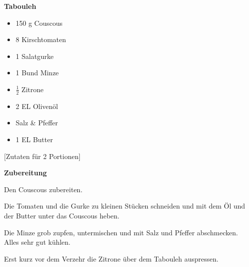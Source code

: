 

\parindent0pt	

\pagestyle{empty}


\textbf{{\LARGE Tabouleh}}%

\hrulefill
\vspace*{\fill}
\begin{multicols}{2}	


\begin{itemize}
\item 150 g Couscous
\item 8 Kirschtomaten
\item 1 Salatgurke
\item 1 Bund Minze
\item $\frac{1}{2}$ Zitrone
\item 2 EL Olivenöl
\item Salz \& Pfeffer
\item 1 EL Butter
\end{itemize}
\end{multicols}
\vfill									%

\vspace{1cm}
%
\begin{center}
%
[Zutaten für 2 Portionen]%
\end{center}


\vfill
\newpage
\textbf{{\LARGE Zubereitung}}%

\hrulefill

\vspace*{\fill}
\begin{multicols}{2}

Den Couscous zubereiten.\newline

Die Tomaten und die Gurke zu kleinen Stücken schneiden und mit dem Öl und der Butter unter das Couscous heben.\newline

Die Minze grob zupfen, untermischen und mit Salz und Pfeffer abschmecken.\newline
Alles sehr gut kühlen.\newline

Erst kurz vor dem Verzehr die Zitrone über dem Tabouleh auspressen.



\end{multicols}
\vfill
